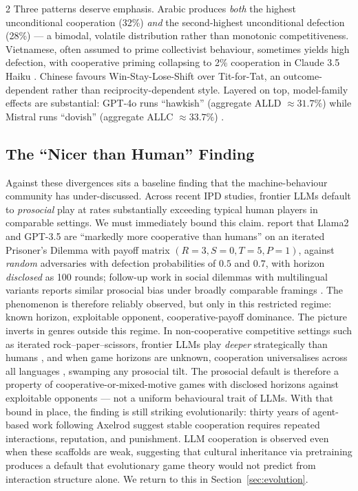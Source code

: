 \documentclass[openacc]{rsproca_new}
\begin{document}
\begin{multicols}{2}
Three patterns deserve emphasis. Arabic produces \emph{both} the highest unconditional cooperation (32\%) \emph{and} the second-highest unconditional defection (28\%) --- a bimodal, volatile distribution rather than monotonic competitiveness. Vietnamese, often assumed to prime collectivist behaviour, sometimes yields high defection, with cooperative priming collapsing to 2\% cooperation in Claude 3.5 Haiku \cite{huynh2025fairgame}. Chinese favours Win-Stay-Lose-Shift over Tit-for-Tat, an outcome-dependent rather than reciprocity-dependent style. Layered on top, model-family effects are substantial: GPT-4o runs ``hawkish'' (aggregate ALLD $\approx 31.7\%$) while Mistral runs ``dovish'' (aggregate ALLC $\approx 33.7\%$) \cite{huynh2026moreatstake}.

\subsection{The ``Nicer than Human'' Finding}

Against these divergences sits a baseline finding that the machine-behaviour community has under-discussed. Across recent IPD studies, frontier LLMs default to \emph{prosocial} play at rates substantially exceeding typical human players in comparable settings. We must immediately bound this claim. \citeauthor{fontana2024nicer} \cite{fontana2024nicer} report that Llama2 and GPT-3.5 are ``markedly more cooperative than humans'' on an iterated Prisoner's Dilemma with payoff matrix $(R{=}3, S{=}0, T{=}5, P{=}1)$, against \emph{random} adversaries with defection probabilities of $0.5$ and $0.7$, with horizon \emph{disclosed} as 100 rounds; follow-up work in social dilemmas with multilingual variants reports similar prosocial bias under broadly comparable framings \cite{za2026towards}. The phenomenon is therefore reliably observed, but only in this restricted regime: known horizon, exploitable opponent, cooperative-payoff dominance. The picture inverts in genres outside this regime. In non-cooperative competitive settings such as iterated rock--paper--scissors, frontier LLMs play \emph{deeper} strategically than humans \cite{wang2026discovering}, and when game horizons are unknown, cooperation universalises across all languages \cite{buscemi2025fairgame, lore2024framing}, swamping any prosocial tilt. The prosocial default is therefore a property of cooperative-or-mixed-motive games with disclosed horizons against exploitable opponents --- not a uniform behavioural trait of LLMs. With that bound in place, the finding is still striking evolutionarily: thirty years of agent-based work following Axelrod \cite{axelrod1984evolution} suggest stable cooperation requires repeated interactions, reputation, and punishment. LLM cooperation is observed even when these scaffolds are weak, suggesting that cultural inheritance via pretraining produces a default that evolutionary game theory would not predict from interaction structure alone. We return to this in Section~\ref{sec:evolution}.


\end{multicols}
\end{document}
